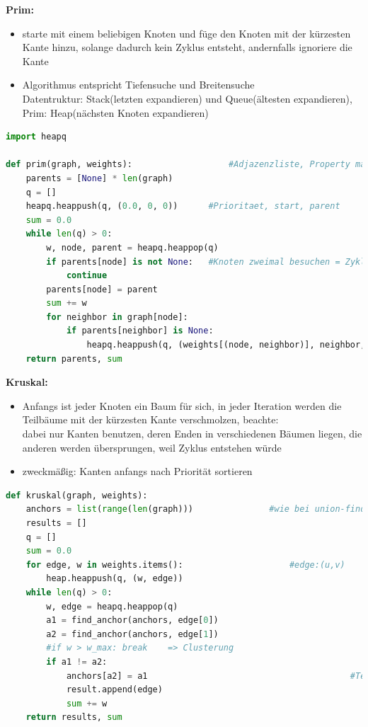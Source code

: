 \documentclass[11pt, fleqn]{scrreprt}
\begin{document}
	\textbf{Prim:} \begin{itemize}
		\item starte mit einem beliebigen Knoten und füge den Knoten mit der kürzesten Kante hinzu, solange dadurch kein Zyklus entsteht, andernfalls ignoriere die Kante
		\item Algorithmus entspricht Tiefensuche und Breitensuche\\
		Datentruktur: Stack(letzten expandieren) und Queue(ältesten expandieren), Prim: Heap(nächsten Knoten expandieren)
	\end{itemize}
	
	\begin{lstlisting}[language=Python]
import heapq

def prim(graph, weights):   				#Adjazenzliste, Property map
	parents = [None] * len(graph)
	q = []
	heapq.heappush(q, (0.0, 0, 0))  	#Prioritaet, start, parent
	sum = 0.0
	while len(q) > 0:
		w, node, parent = heapq.heappop(q)
		if parents[node] is not None:   #Knoten zweimal besuchen = Zyklus => ueberspringen
			continue
		parents[node] = parent
		sum += w
		for neighbor in graph[node]:
			if parents[neighbor] is None:
				heapq.heappush(q, (weights[(node, neighbor)], neighbor, node))#prio,node,parent
	return parents, sum
	\end{lstlisting}
	
	\textbf{Kruskal:}
	\begin{itemize}
		\item Anfangs ist jeder Knoten ein Baum für sich, in jeder Iteration werden die Teilbäume mit der kürzesten Kante verschmolzen, beachte:\\
		dabei nur Kanten benutzen, deren Enden in verschiedenen Bäumen liegen, die anderen werden übersprungen, weil Zyklus entstehen würde
		\item zweckmäßig: Kanten anfangs nach Priorität sortieren
	\end{itemize}
	
	\begin{lstlisting}[language=Python]
def kruskal(graph, weights):
	anchors = list(range(len(graph)))   			#wie bei union-find
	results = []    													#enthaelt spaeter die Kanten des Baums
	q = []
	sum = 0.0
	for edge, w in weights.items(): 					#edge:(u,v)
		heap.heappush(q, (w, edge))
	while len(q) > 0:
		w, edge = heapq.heappop(q)
		a1 = find_anchor(anchors, edge[0])
		a2 = find_anchor(anchors, edge[1])
		#if w > w_max: break    => Clusterung
		if a1 != a2:    												#u und v in verschiedenen Teilbaeumen
			anchors[a2] = a1    									#Teilbaeume verschmelzen
			result.append(edge)
			sum += w
	return results, sum
	\end{lstlisting}
	
\end{document}
